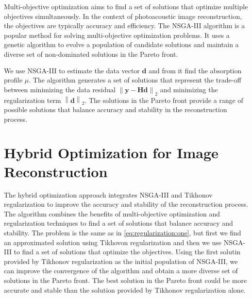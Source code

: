 Multi-objective optimization aims to find a set of solutions that optimize multiple objectives simultaneously. In the context of photoacoustic image reconstruction, the objectives are typically accuracy and efficiency. The NSGA-III algorithm is a popular method for solving multi-objective optimization problems. It uses a genetic algorithm to evolve a population of candidate solutions and maintain a diverse set of non-dominated solutions in the Pareto front.

We use NSGA-III to estimate the data vector $\mathbf{d}$ and from it find the absorption profile $\mu$. The algorithm generates a set of solutions that represent the trade-off between minimizing the data residual $\left\| \mathbf{y} - \mathbf{H} \mathbf{d} \right\|_2$ and minimizing the regularization term $\left\| \mathbf{d} \right\|_2$. The solutions in the Pareto front provide a range of possible solutions that balance accuracy and stability in the reconstruction process.


\section{Hybrid Optimization for Image Reconstruction} \label{sec:method:third}

The hybrid optimization approach integrates NSGA-III and Tikhonov regularization to improve the accuracy and stability of the reconstruction process. The algorithm combines the benefits of multi-objective optimization and regularization techniques to find a set of solutions that balance accuracy and stability. The problem is the same as in \ref{eq:regularization:one}, but first we find an approximated solution using Tikhovon regularization and then we use NSGA-III to find a set of solutions that optimize the objectives. Using the first solutin provided by Tikhonov regularization as the initial population of NSGA-III, we can improve the convergence of the algorithm and obtain a more diverse set of solutions in the Pareto front. The best solution in the Pareto front could be more accurate and stable than the solution provided by Tikhonov regularization alone.





%
